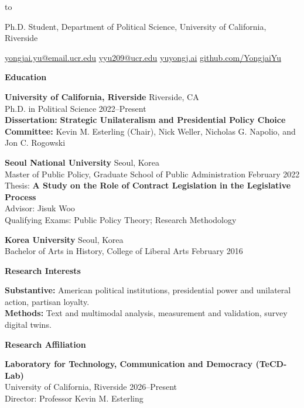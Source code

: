 \documentclass[11pt]{article}
\newcommand{\cvsection}[1]{%
  \par\addvspace{12pt}
  \Needspace{5\baselineskip}
  {\large\sffamily\bfseries\color{cvaccent}#1}\par\nobreak
  \vspace{3pt}{\color{cvrule}\hrule height 0.3pt}\nobreak
  \vspace{8pt}
}
\newcommand{\cvdate}[1]{{\small\color{cvmuted}#1}}
\newcommand{\entry}[4]{%
  \textbf{#1} \hfill {\small\color{cvmuted}#2}\\
  #3 \hfill \cvdate{#4}
}
\begin{document}
\raggedbottom

\noindent\hbox to \par
\vspace{10pt}
\begingroup
\centering
Ph.D. Student, Department of Political Science, University of California, Riverside\par
\vspace{4pt}
{\small
\href{mailto:yongjai.yu@email.ucr.edu}{yongjai.yu@email.ucr.edu}
\enspace\textbar\enspace
\href{mailto:yyu209@ucr.edu}{yyu209@ucr.edu}
\enspace\textbar\enspace
\href{https://yuyongj.ai}{yuyongj.ai}
\enspace\textbar\enspace
\href{https://github.com/YongjaiYu}{github.com/YongjaiYu}}\par
\endgroup

\cvsection{Education}

\entry{University of California, Riverside}{Riverside, CA}{Ph.D. in Political Science}{2022--Present}\\
\textbf{Dissertation:} \textbf{Strategic Unilateralism and Presidential Policy Choice}\\
\textbf{Committee:} Kevin M. Esterling (Chair), Nick Weller, Nicholas G. Napolio, and Jon C. Rogowski

\vspace{0.35cm}
\entry{Seoul National University}{Seoul, Korea}{Master of Public Policy, Graduate School of Public Administration}{February 2022}\\
Thesis: \textbf{A Study on the Role of Contract Legislation in the Legislative Process}\\
Advisor: Jisuk Woo\\
Qualifying Exams: Public Policy Theory; Research Methodology

\vspace{0.35cm}
\entry{Korea University}{Seoul, Korea}{Bachelor of Arts in History, College of Liberal Arts}{February 2016}

\cvsection{Research Interests}

\textbf{Substantive:} American political institutions, presidential power and unilateral action, partisan loyalty.\\
\textbf{Methods:} Text and multimodal analysis, measurement and validation, survey digital twins.

\cvsection{Research Affiliation}

\textbf{Laboratory for Technology, Communication and Democracy (TeCD-Lab)}\\
University of California, Riverside \hfill \cvdate{2026--Present}\\
Director: Professor Kevin M. Esterling
\end{document}
